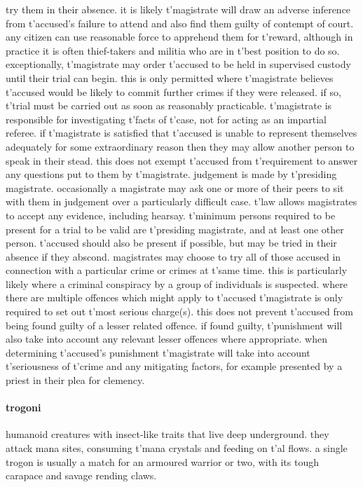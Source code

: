 try them in their absence. it is likely t'\allowbreak magistrate will draw an adverse inference from t'\allowbreak accused's failure to attend and also find them guilty of contempt of court. any citizen can use reasonable force to apprehend them for t'\allowbreak reward, although in practice it is often thief-takers and militia who are in t'\allowbreak best position to do so. exceptionally, t'\allowbreak magistrate may order t'\allowbreak accused to be held in supervised custody until their trial can begin. this is only permitted where t'\allowbreak magistrate believes t'\allowbreak accused would be likely to commit further crimes if they were released. if so, t'\allowbreak trial must be carried out as soon as reasonably practicable. t'\allowbreak magistrate is responsible for investigating t'\allowbreak facts of t'\allowbreak case, not for acting as an impartial referee. if t'\allowbreak magistrate is satisfied that t'\allowbreak accused is unable to represent themselves adequately for some extraordinary reason then they may allow another person to speak in their stead. this does not exempt t'\allowbreak accused from t'\allowbreak requirement to answer any questions put to them by t'\allowbreak magistrate. judgement is made by t'\allowbreak presiding magistrate. occasionally a magistrate may ask one or more of their peers to sit with them in judgement over a particularly difficult case. t'\allowbreak law allows magistrates to accept any evidence, including hearsay. t'\allowbreak minimum persons required to be present for a trial to be valid are t'\allowbreak presiding magistrate, and at least one other person. t'\allowbreak accused should also be present if possible, but may be tried in their absence if they abscond. magistrates may choose to try all of those accused in connection with a particular crime or crimes at t'\allowbreak same time. this is particularly likely where a criminal conspiracy by a group of individuals is suspected. where there are multiple offences which might apply to t'\allowbreak accused t'\allowbreak magistrate is only required to set out t'\allowbreak most serious charge(s). this does not prevent t'\allowbreak accused from being found guilty of a lesser related offence. if found guilty, t'\allowbreak punishment will also take into account any relevant lesser offences where appropriate. when determining t'\allowbreak accused's punishment t'\allowbreak magistrate will take into account t'\allowbreak seriousness of t'\allowbreak crime and any mitigating factors, for example presented by a priest in their plea for clemency.
\paragraph{trogoni} humanoid creatures with insect-like traits that live deep underground. they attack mana sites, consuming t'\allowbreak mana crystals and feeding on t'\allowbreak {}al flows. a single trogon is usually a match for an armoured warrior or two, with its tough carapace and savage rending claws.
